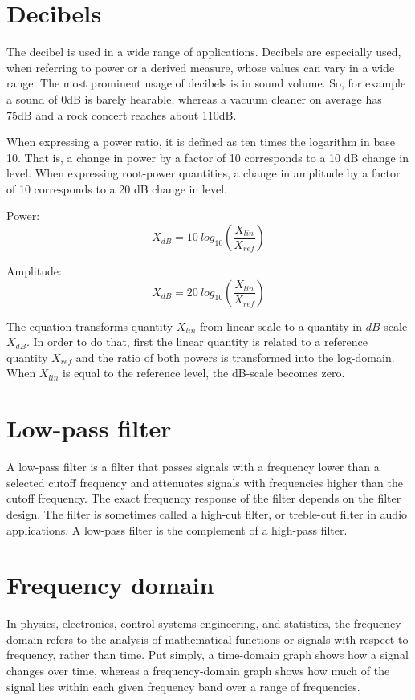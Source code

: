 \documentclass[journal,compsoc]{IEEEtran}
\begin{document}
\section{Decibels}
The decibel is used in a wide range of applications. Decibels are especially used, when referring to power or a derived measure, whose values can vary in a wide range. The most prominent usage of decibels is in sound volume. So, for example a sound of 0dB is barely hearable, whereas a vacuum cleaner on average has 75dB and a rock concert reaches about 110dB.

When expressing a power ratio, it is defined as ten times the logarithm in base 10. That is, a change in power by a factor of 10 corresponds to a 10 dB change in level. When expressing root-power quantities, a change in amplitude by a factor of 10 corresponds to a 20 dB change in level.

Power:
\[ X_{dB} = 10\ log_{10}\left(\frac{X_{lin}}{X_{ref}}\right)\]

Amplitude:
\[ X_{dB} = 20\ log_{10}\left(\frac{X_{lin}}{X_{ref}}\right)\]

The equation transforms quantity \(X_{lin}\) from linear scale to a quantity in \(dB\) scale \(X_{dB}\). In order to do that, first the linear quantity is related to a reference quantity \(X_{ref}\) and the ratio of both powers is transformed into the log-domain. When \(X_{lin}\) is equal to the reference level, the dB-scale becomes zero.

\section{Low-pass filter}
A low-pass filter is a filter that passes signals with a frequency lower than a selected cutoff frequency and attenuates signals with frequencies higher than the cutoff frequency. The exact frequency response of the filter depends on the filter design. The filter is sometimes called a high-cut filter, or treble-cut filter in audio applications. A low-pass filter is the complement of a high-pass filter.

\section{Frequency domain}
In physics, electronics, control systems engineering, and statistics, the frequency domain refers to the analysis of mathematical functions or signals with respect to frequency, rather than time. Put simply, a time-domain graph shows how a signal changes over time, whereas a frequency-domain graph shows how much of the signal lies within each given frequency band over a range of frequencies.
\end{document}
